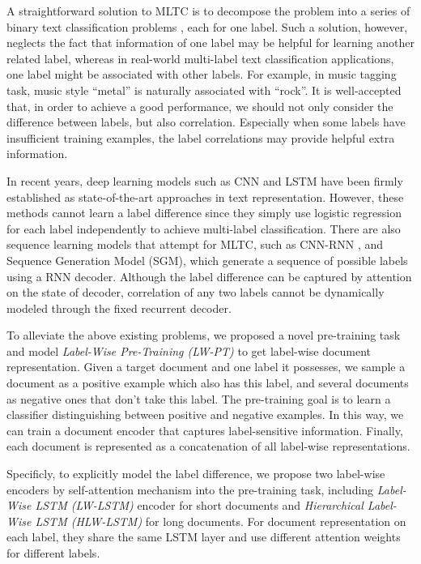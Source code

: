 \documentclass[runningheads]{llncs}
\begin{document}
A straightforward solution to MLTC is to decompose the problem into a series of binary text classification problems \cite{boutell2004learning}, each for one label. Such a solution, however, neglects the fact that information of one label may be helpful for learning another related label, whereas in real-world multi-label text classification applications, one label might be associated with other labels. For example, in music tagging task, music style ``metal'' is naturally associated with ``rock''. It is well-accepted that, in order to achieve a good performance, we should not only consider the difference between labels, but also correlation. Especially when some labels have insufficient training examples, the label correlations may provide helpful extra information.

In recent years, deep learning models such as CNN \cite{kim2014convolutional} and LSTM \cite{hochreiter1997long} have been firmly established as state-of-the-art approaches in text representation. However, these methods cannot learn a label difference since they simply use logistic regression for each label independently to achieve multi-label classification. There are also sequence learning models that attempt for MLTC, such as CNN-RNN \cite{chen2017ensemble}, and Sequence Generation Model (SGM)\cite{yang2018sgm}, which generate a sequence of possible labels using a RNN decoder. Although the label difference can be captured by attention on the state of decoder, correlation of any two labels cannot be dynamically modeled through the fixed recurrent decoder. 

To alleviate the above existing problems, we proposed a novel pre-training task and model \textit{Label-Wise Pre-Training (LW-PT)} to get label-wise document representation. Given a target document and one label it possesses, we sample a document as a positive example which also has this label, and several documents as negative ones that don't take this label. The pre-training goal is to learn a classifier distinguishing between positive and negative examples. In this way, we can train a document encoder that captures label-sensitive information. Finally, each document is represented as a concatenation of all label-wise representations.

Specificly, to explicitly model the label difference, we propose two label-wise encoders by self-attention mechanism into the pre-training task, including \textit{Label-Wise LSTM (LW-LSTM)} encoder for short documents and \textit{Hierarchical Label-Wise LSTM (HLW-LSTM)} for long documents. For document representation on each label, they share the same LSTM layer and use different attention weights for different labels.
\end{document}
